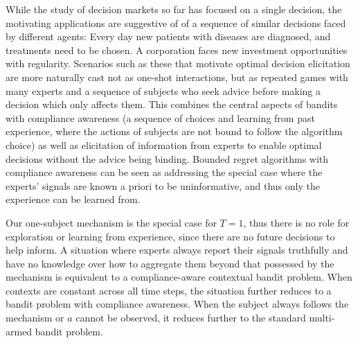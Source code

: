 



While the study of decision markets so far has focused on a single decision, the motivating applications are suggestive of of a sequence of similar decisions faced by different agents:
Every day new patients with diseases are diagnosed, and treatments need to be chosen. 
A corporation faces new investment opportunities with regularity.
Scenarios such as these that motivate optimal decision elicitation are more naturally cast not as one-shot interactions, but as repeated games with many experts and a sequence of subjects who seek advice before making a decision which only affects them.
This combines the central aspects of bandits with compliance awareness (a sequence of choices and learning from past experience, where the actions of subjects are not bound to follow the algorithm choice) as well as elicitation of information from experts to enable optimal decisions without the advice being binding. 
Bounded regret algorithms with compliance awareness can be seen as addressing the special case where the experts' signals are known a priori to be uninformative, and thus only the experience can be learned from.

Our one-subject mechanism is the special case for $T={1}$, thus there is no role for exploration or learning from experience, since there are no future decisions to help inform.
A situation where experts always report their signals truthfully and have no knowledge over how to aggregate them beyond that possessed by the mechanism is equivalent to a compliance-aware contextual bandit problem. 
When contexts are constant across all time steps, the situation further reduces to a bandit problem with compliance awareness.
When the subject always follows the mechanism or $a$ cannot be observed, it reduces further  to the standard multi-armed bandit problem. 

